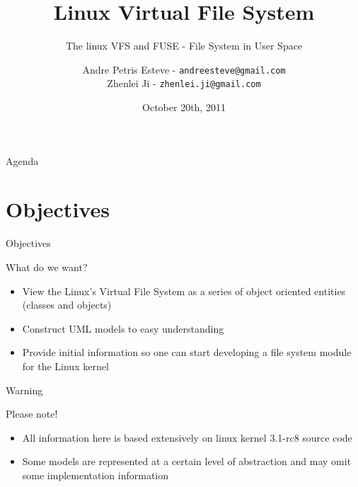 \documentclass{beamer}
\author[Andre Esteve and Zhenlei Ji]{
Andre Petris Esteve - \texttt{andreesteve@gmail.com}\\
Zhenlei Ji - \texttt{zhenlei.ji@gmail.com}}
\institute[IC\textbackslash UNICAMP]{
MC806 - Operational System Topics\\}
\title[Linux VFS]{Linux Virtual File System}
\subtitle[]{The linux VFS and FUSE - File System in User Space}
\date[10/20/2011]{October 20th, 2011}
\begin{document}

\begin{frame}[plain]
  \titlepage
\end{frame}

\begin{frame}{Agenda}
  \tableofcontents
\end{frame}

\section{Objectives}

\begin{frame}{Objectives}

  \begin{block}{What do we want?}

	\begin{itemize}[<+->]

		\item{View the Linux's Virtual File System as a series of object oriented entities (classes and objects)}

		\item{Construct UML models to easy understanding}
		
		\item{Provide initial information so one can start developing a file system module for the Linux kernel}
	
	\end{itemize}

  \end{block}

\end{frame}

\begin{frame}{Warning}

  \begin{block}{Please note!}

	\begin{itemize}[<+->]

		\item{All information here is based extensively on linux kernel 3.1-rc8 source code}

		\item{Some models are represented at a certain level of abstraction and may omit some implementation information}
	
	\end{itemize}

  \end{block}

\end{frame}
\end{document}
